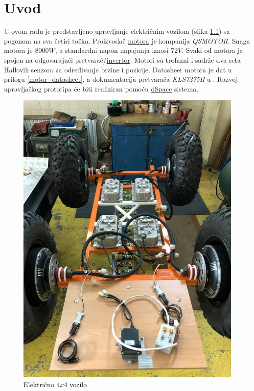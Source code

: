 \chapter{Uvod}

\qquad U ovom radu je predstavljeno upravljanje električnim vozilom (slika \ref{car:buggy}) sa pogonom na sva četiri točka. Proizvođač \href{https://www.qsmotor.com/product/8000w-car-motor/}{motora} je kompanija \textit{QSMOTOR}. Snaga motora je $8000W$, a standardni napon napajanja iznosi $72V$. Svaki od motora je spojen na odgovarajući pretvarač/\href{https://kellycontroller.com/shop/kls-h/}{invertor}. Motori su trofazni i sadrže dva seta Hallovih senzora za određivanje brzine i pozicije. Datasheet motora je dat u prilogu \ref{motor_datasheet}, a dokumentacija pretvarača \textit{KLS7275H} u \cite{kls7275h}. Razvoj upravljačkog prototipa će biti realiziran pomoću \href{https://www.dspace.com/en/inc/home/products/hw/microlabbox.cfm?fbclid=IwAR08_hHwsXPVRs6ng2DLSU5HA3vDNzpBa9CMpO8DWlSQ1DXPK58BkLmoiRE}{dSpace} sistema.

\begin{figure}
\begin{center}
\includegraphics[scale=0.5]{slike/electric_car.jpg}
\end{center}
\caption{Električno $4x4$ vozilo}
\label{car:buggy}
\end{figure}

